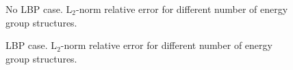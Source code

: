 \begin{figure}[htbp!]
	\centering
	\hfill
    \caption{No LBP case. L$_2$-norm relative error for different number of energy group structures.}
	\label{fig:assembly-noLBP-er}
\end{figure}

\begin{figure}[htbp!]
	\centering
	\hfill
    \caption{LBP case. L$_2$-norm relative error for different number of energy group structures.}
	\label{fig:assembly-LBP-er}
\end{figure}

